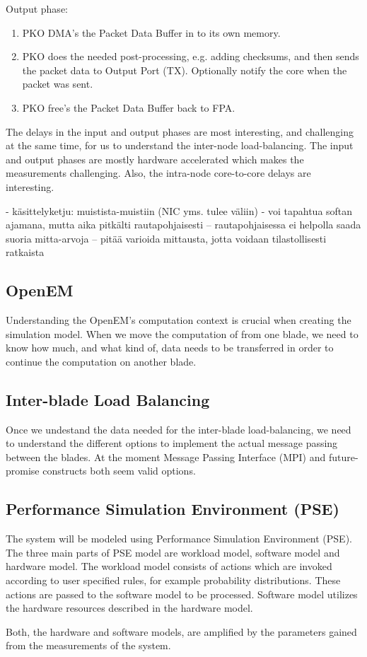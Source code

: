 Output phase:
\begin{enumerate}
\item PKO DMA's the Packet Data Buffer in to its own memory.
\item PKO does the needed post-processing, e.g. adding checksums, and then sends the packet data to Output Port (TX). Optionally notify the core when the packet was sent.
\item PKO free's the Packet Data Buffer back to FPA.
\end{enumerate}

The delays in the input and output phases are most interesting, and challenging at the same time, for us to understand the inter-node load-balancing. The input and output phases are mostly hardware accelerated which makes the measurements challenging. Also, the intra-node core-to-core delays are interesting.

- käsittelyketju: muistista-muistiin (NIC yms. tulee väliin)
- voi tapahtua softan ajamana, mutta aika pitkälti rautapohjaisesti
  -- rautapohjaisessa ei helpolla saada suoria mitta-arvoja
  -- pitää varioida mittausta, jotta voidaan tilastollisesti ratkaista

\subsection{OpenEM}
Understanding the OpenEM's computation context is crucial when creating the simulation model. When we move the computation of from one blade, we need to know how much, and what kind of, data needs to be transferred in order to continue the computation on another blade.

\subsection{Inter-blade Load Balancing}
Once we undestand the data needed for the inter-blade load-balancing, we need to understand the different options to implement the actual message passing between the blades. At the moment Message Passing Interface (MPI) and future-promise constructs both seem valid options.

\subsection{Performance Simulation Environment (PSE)}
The system will be modeled using Performance Simulation Environment (PSE). The three main parts of PSE  model are workload model, software model and hardware model. The workload model consists of actions which are invoked according to user specified rules, for example probability distributions. These actions are passed to the software model to be processed. Software model utilizes the hardware resources described in the hardware model.

Both, the hardware and software models, are amplified by the parameters gained from the measurements of the system.

